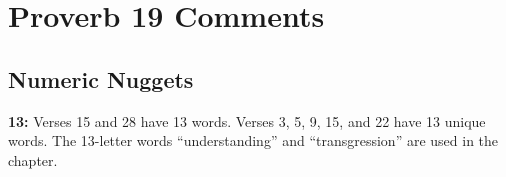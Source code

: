 \section{Proverb 19 Comments}

\subsection{Numeric Nuggets}
\textbf{13:} Verses 15 and 28 have 13 words. Verses 3, 5, 9, 15, and 22 have 13 unique words. The 13-letter words ``understanding'' and ``transgression'' are used in the chapter.

